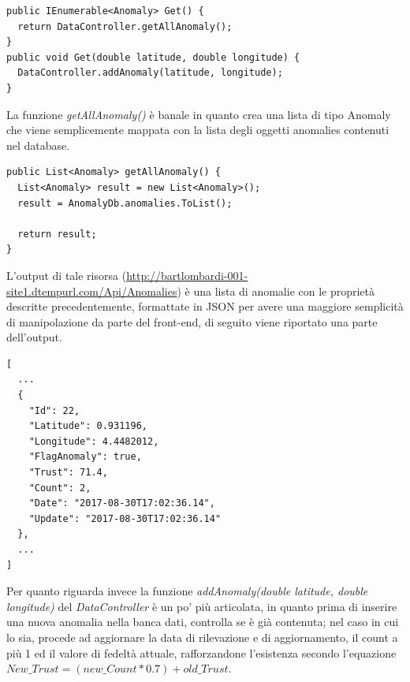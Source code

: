 \documentclass[a4paper, 11pt]{article} %
\begin{document}
\begin{lstlisting}
public IEnumerable<Anomaly> Get() { 
  return DataController.getAllAnomaly(); 
}
public void Get(double latitude, double longitude) {
  DataController.addAnomaly(latitude, longitude);
}
\end{lstlisting}
La funzione \textit{getAllAnomaly()} è banale in quanto crea una lista di tipo Anomaly che viene semplicemente mappata con la lista degli oggetti anomalies contenuti nel database.

\begin{lstlisting}
public List<Anomaly> getAllAnomaly() {   
  List<Anomaly> result = new List<Anomaly>();
  result = AnomalyDb.anomalies.ToList();

  return result;
}
\end{lstlisting}
L'output di tale risorsa (\url{http://bartlombardi-001-site1.dtempurl.com/Api/Anomalies}) è una lista di anomalie con le proprietà descritte precedentemente, formattate in JSON per avere una maggiore semplicità di manipolazione da parte del front-end, di seguito viene riportato una parte dell'output.
\begin{verbatim}
[
  ...
  {
    "Id": 22,
    "Latitude": 0.931196,
    "Longitude": 4.4482012,
    "FlagAnomaly": true,
    "Trust": 71.4,
    "Count": 2,
    "Date": "2017-08-30T17:02:36.14",
    "Update": "2017-08-30T17:02:36.14"
  },
  ...
]
\end{verbatim}
Per quanto riguarda invece la funzione \textit{addAnomaly(double latitude, double longitude)} del \textit{DataController} è un po’ più articolata, in quanto prima di inserire una nuova anomalia nella banca dati, controlla se è già contenuta; nel caso in cui lo sia, procede ad aggiornare la data di rilevazione e di aggiornamento, il count a più 1 ed il valore di fedeltà attuale, rafforzandone l'esistenza secondo l'equazione $New\_Trust = (new\_Count * 0.7) + old\_Trust$. 
\end{document}
